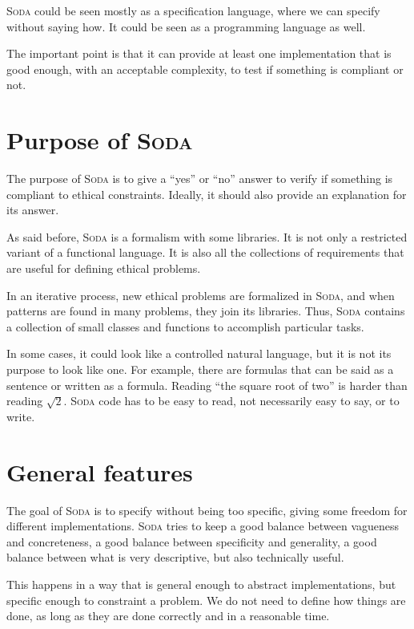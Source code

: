\documentclass[12pt,a4paper]{book}
\newcommand{\Soda}{\textsc{Soda}\xspace}
\begin{document}
    \Soda could be seen mostly as a specification language, where we can specify without saying how.
    It could be seen as a programming language as well.

    The important point is that it can provide at least one implementation that is good enough, with an acceptable complexity, to test if something is compliant or not.


    \section{Purpose of \Soda}

    The purpose of \Soda is to give a ``yes'' or ``no'' answer to verify if something is compliant to ethical constraints.
    Ideally, it should also provide an explanation for its answer.

    As said before, \Soda is a formalism with some libraries.
    It is not only a restricted variant of a functional language.
    It is also all the collections of requirements that are useful for defining ethical problems.

    In an iterative process, new ethical problems are formalized in \Soda, and when patterns are found in many problems, they join its libraries.
    Thus, \Soda contains a collection of small classes and functions to accomplish particular tasks.

    In some cases, it could look like a controlled natural language, but it is not its purpose to look like one.
    For example, there are formulas that can be said as a sentence or written as a formula.
    Reading ``the square root of two'' is harder than reading $\sqrt{2}$.
    \Soda code has to be easy to read, not necessarily easy to say, or to write.


    \section{General features}

    The goal of \Soda is to specify without being too specific, giving some freedom for different implementations.
    \Soda tries to keep a good balance between vagueness and concreteness, a good balance between specificity and generality,
    a good balance between what is very descriptive, but also technically useful.

    This happens in a way that is general enough to abstract implementations, but specific enough to constraint a problem.
    We do not need to define how things are done, as long as they are done correctly and in a reasonable time.
\end{document}
